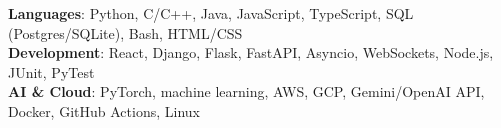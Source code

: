 \begin{itemize}[leftmargin=0.15in, label={}]
    \small{\item{
     \textbf{Languages}{: Python, C/C++, Java, JavaScript, TypeScript, SQL (Postgres/SQLite), Bash, HTML/CSS} \\
     \textbf{Development}{: React, Django, Flask, FastAPI, Asyncio, WebSockets, Node.js, JUnit, PyTest} \\
     \textbf{AI \& Cloud}{: PyTorch, machine learning, AWS, GCP, Gemini/OpenAI API, Docker, GitHub Actions, Linux}
    }}
\end{itemize}
